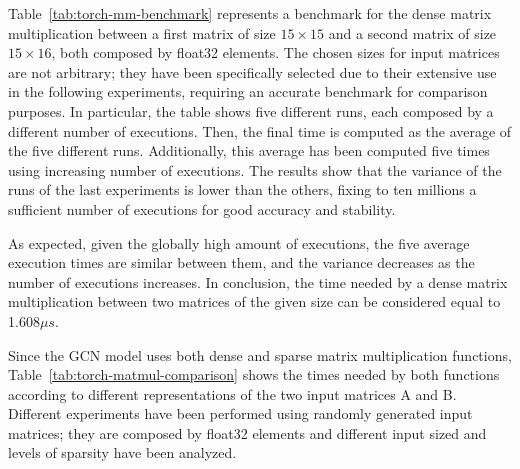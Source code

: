 Table~\ref{tab:torch-mm-benchmark} represents a benchmark for the dense matrix multiplication between a first matrix of size $15 \times 15$ and a second matrix of size $15 \times 16$, both composed by float32 elements.
The chosen sizes for input matrices are not arbitrary; they have been specifically selected due to their extensive use in the following experiments, requiring an accurate benchmark for comparison purposes.
In particular, the table shows five different runs, each composed by a different number of executions.
Then, the final time is computed as the average of the five different runs.
Additionally, this average has been computed five times using increasing number of executions.
The results show that the variance of the runs of the last experiments is lower than the others, fixing to ten millions a sufficient number of executions for good accuracy and stability.

As expected, given the globally high amount of executions, the five average execution times are similar between them, and the variance decreases as the number of executions increases.
In conclusion, the time needed by a dense matrix multiplication between two matrices of the given size can be considered equal to 1.608$\mu s$.

Since the GCN model uses both dense and sparse matrix multiplication functions, Table~\ref{tab:torch-matmul-comparison} shows the times needed by both functions according to different representations of the two input matrices A and B\@.
Different experiments have been performed using randomly generated input matrices; they are composed by float32 elements and different input sized and levels of sparsity have been analyzed.

